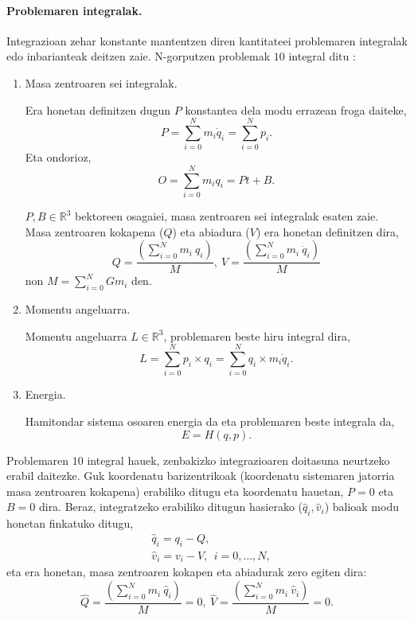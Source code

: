 \paragraph*{Problemaren integralak.}
Integrazioan zehar konstante mantentzen diren kantitateei problemaren integralak edo inbarianteak deitzen zaie. N-gorputzen problemak $10$ integral ditu \cite{Klioner2016}:
\begin{enumerate}


\item Masa zentroaren sei integralak.

Era honetan definitzen dugun $P$ konstantea dela modu errazean froga daiteke, 
\begin{equation*}
P=\sum_{i=0}^{N} m_i \dot{q}_i=\sum_{i=0}^{N} p_i. 
\end{equation*}
Eta ondorioz,
\begin{equation*}
O=\sum_{i=0}^{N} m_i {q}_i=Pt+B. 
\end{equation*}

$P,B \in \mathbb{R}^3$ bektoreen osagaiei, masa zentroaren sei integralak esaten zaie. Masa zentroaren kokapena ($Q$) eta abiadura ($V$)  era honetan definitzen dira, 
\begin{equation*}
Q=\frac{\left(\sum\limits_{i=0}^{N} m_i \ q_i\right)}{M}, \ V=\frac{\left(\sum\limits_{i=0}^{N} m_i \ \dot{q}_i\right)}{M}
\end{equation*}
non $M=\sum\limits_{i=0}^{N}Gm_i$ den.


\item Momentu angeluarra.

Momentu angeluarra $L\in \mathbb{R}^3$, problemaren beste hiru integral dira, 
\begin{equation*}
L=\sum_{i=0}^{N} p_i \times q_i=\sum_{i=0}^{N} q_i \times m_i \dot{q}_i.
\end{equation*}

\item Energia.

Hamitondar sistema osoaren energia da eta problemaren beste integrala da,
\begin{equation*}
E=H(q,p).
\end{equation*}

\end{enumerate}

Problemaren $10$ integral hauek, zenbakizko integrazioaren doitasuna neurtzeko erabil daitezke. Guk koordenatu barizentrikoak (koordenatu sistemaren jatorria masa zentroaren kokapena) erabiliko ditugu eta koordenatu hauetan, $P=0$ eta $B=0$ dira. Beraz, integratzeko erabiliko ditugun hasierako ($\hat{q}_i,\hat{v}_i$) balioak  modu honetan finkatuko ditugu,
\begin{align*}
&\hat{q}_i=q_i-Q, \\
&\hat{v}_i=v_i-V, \ \ i=0,\dots,N,
\end{align*}
eta era honetan, masa zentroaren kokapen eta abiadurak zero egiten dira:
\begin{equation*}
\hat{Q}=\frac{\left(\sum\limits_{i=0}^{N} m_i \ \hat{q}_i\right)}{M}=0, \ \hat{V}=\frac{\left(\sum\limits_{i=0}^{N} m_i \ \hat{v}_i\right)}{M}=0.
\end{equation*}

